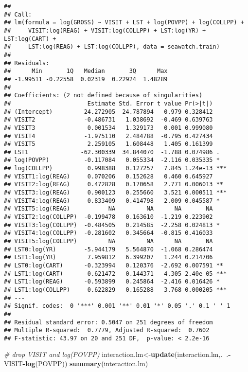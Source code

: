 \documentclass[]{article}
\newenvironment{Shaded}{\begin{snugshade}}{\end{snugshade}}
\newcommand{\KeywordTok}[1]{\textcolor[rgb]{0.13,0.29,0.53}{\textbf{#1}}}
\newcommand{\CommentTok}[1]{\textcolor[rgb]{0.56,0.35,0.01}{\textit{#1}}}
\newcommand{\OperatorTok}[1]{\textcolor[rgb]{0.81,0.36,0.00}{\textbf{#1}}}
\newcommand{\NormalTok}[1]{#1}
\begin{document}
\begin{verbatim}
## 
## Call:
## lm(formula = log(GROSS) ~ VISIT + LST + log(POVPP) + log(COLLPP) + 
##     VISIT:log(REAG) + VISIT:log(COLLPP) + LST:log(YR) + LST:log(CART) + 
##     LST:log(REAG) + LST:log(COLLPP), data = seawatch.train)
## 
## Residuals:
##      Min       1Q   Median       3Q      Max 
## -1.99511 -0.22558  0.02319  0.22924  1.48289 
## 
## Coefficients: (2 not defined because of singularities)
##                      Estimate Std. Error t value Pr(>|t|)    
## (Intercept)         24.272905  24.787894   0.979 0.328412    
## VISIT2              -0.486731   1.038692  -0.469 0.639763    
## VISIT3               0.001534   1.329173   0.001 0.999080    
## VISIT4              -1.975110   2.484788  -0.795 0.427434    
## VISIT5               2.259105   1.608448   1.405 0.161399    
## LST1               -62.300339  34.844070  -1.788 0.074986 .  
## log(POVPP)          -0.117084   0.055334  -2.116 0.035335 *  
## log(COLLPP)          0.998388   0.127257   7.845 1.24e-13 ***
## VISIT1:log(REAG)     0.070206   0.152628   0.460 0.645927    
## VISIT2:log(REAG)     0.472828   0.170658   2.771 0.006013 ** 
## VISIT3:log(REAG)     0.900123   0.255660   3.521 0.000511 ***
## VISIT4:log(REAG)     0.833409   0.414798   2.009 0.045587 *  
## VISIT5:log(REAG)           NA         NA      NA       NA    
## VISIT2:log(COLLPP)  -0.199478   0.163610  -1.219 0.223902    
## VISIT3:log(COLLPP)  -0.484505   0.214585  -2.258 0.024813 *  
## VISIT4:log(COLLPP)  -0.281602   0.345664  -0.815 0.416033    
## VISIT5:log(COLLPP)         NA         NA      NA       NA    
## LST0:log(YR)        -5.944179   5.564870  -1.068 0.286474    
## LST1:log(YR)         7.959812   6.399207   1.244 0.214706    
## LST0:log(CART)      -0.323994   0.120376  -2.692 0.007591 ** 
## LST1:log(CART)      -0.621472   0.144371  -4.305 2.40e-05 ***
## LST1:log(REAG)      -0.593899   0.245864  -2.416 0.016426 *  
## LST1:log(COLLPP)     0.622829   0.165288   3.768 0.000205 ***
## ---
## Signif. codes:  0 '***' 0.001 '**' 0.01 '*' 0.05 '.' 0.1 ' ' 1
## 
## Residual standard error: 0.5047 on 251 degrees of freedom
## Multiple R-squared:  0.7779, Adjusted R-squared:  0.7602 
## F-statistic: 43.97 on 20 and 251 DF,  p-value: < 2.2e-16
\end{verbatim}

\begin{Shaded}
\begin{Highlighting}[]
\CommentTok{# drop VISIT and log(POVPP)}
\NormalTok{interaction.lm<-}\KeywordTok{update}\NormalTok{(interaction.lm,.}\OperatorTok{~}\NormalTok{.}\OperatorTok{-}\NormalTok{VISIT}\OperatorTok{-}\KeywordTok{log}\NormalTok{(POVPP))}
\KeywordTok{summary}\NormalTok{(interaction.lm)}
\end{Highlighting}
\end{Shaded}
\end{document}
